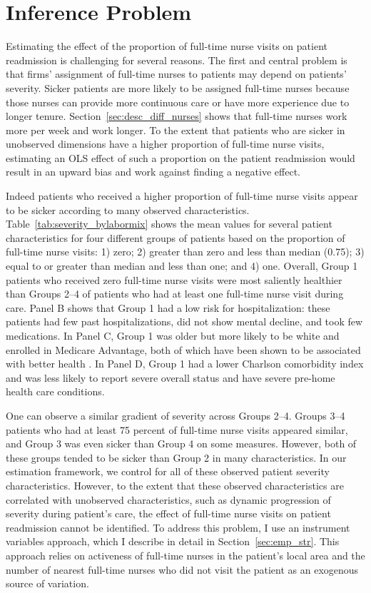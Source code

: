 \documentclass[final,12pt]{article}
\begin{document}
\section{Inference Problem} \label{sec:est_prob}

Estimating the effect of the proportion of full-time nurse visits on patient readmission is challenging for several reasons.
The first and central problem is that firms' assignment of full-time nurses to patients may depend on patients' severity.
Sicker patients are more likely to be assigned full-time nurses because those nurses can provide more continuous care or have more experience due to longer tenure.
Section~\ref{sec:desc_diff_nurses} shows that full-time nurses work more per week and work longer.
To the extent that patients who are sicker in unobserved dimensions have a higher proportion of full-time nurse visits, estimating an OLS effect of such a proportion on the patient readmission would result in an upward bias and work against finding a negative effect.

Indeed patients who received a higher proportion of full-time nurse visits appear to be sicker according to many observed characteristics. Table~\ref{tab:severity_bylabormix} shows the mean values for several patient characteristics for four different groups of patients based on the proportion of full-time nurse visits: 1) zero; 2) greater than zero and less than median (0.75); 3) equal to or greater than median and less than one; and 4) one.
Overall, Group 1 patients who received zero full-time nurse visits were most saliently healthier than Groups 2--4 of patients who had at least one full-time nurse visit during care.
Panel B shows that Group 1 had a low risk for hospitalization: these patients had few past hospitalizations, did not show mental decline, and took few medications.
In Panel C, Group 1 was older but more likely to be white and enrolled in Medicare Advantage, both of which have been shown to be associated with better health \citep{Kawachi2005, Brown2014}.
In Panel D, Group 1 had a lower Charlson comorbidity index and was less likely to report severe overall status and have severe pre-home health care conditions.

One can observe a similar gradient of severity across Groups 2--4.
Groups 3--4 patients who had at least 75 percent of full-time nurse visits appeared similar, and Group 3 was even sicker than Group 4 on some measures. However, both of these groups tended to be sicker than Group 2 in many characteristics.
In our estimation framework, we control for all of these observed patient severity characteristics. However, to the extent that these observed characteristics are correlated with unobserved characteristics, such as dynamic progression of severity during patient's care, the effect of full-time nurse visits on patient readmission cannot be identified.
To address this problem, I use an instrument variables approach, which I describe in detail in Section~\ref{sec:emp_str}. This approach relies on activeness of full-time nurses in the patient's local area and the number of nearest full-time nurses who did not visit the patient as an exogenous source of variation.
\end{document}
